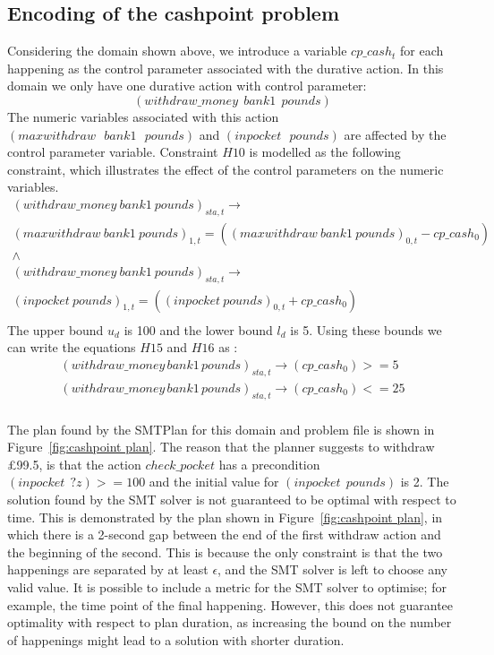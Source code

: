 \subsection{Encoding of the cashpoint problem}

Considering the domain shown above, we introduce a variable $cp\_cash_t$ for each happening as the control parameter associated with the durative action. In this domain we only have one durative action with control parameter:
$$
(withdraw\_money \ \  bank1 \ \  pounds)
$$
The numeric variables associated with this action $(maxwithdraw \ \ \ bank1 \ \ \ pounds)$ and  $(inpocket \ \ \ pounds)$ are affected by the control parameter variable. Constraint $H10$ is modelled as the following constraint, which illustrates the effect of the control parameters on the numeric variables.
$$
\begin{array}{c}
(withdraw\_money\ bank1\ pounds)_{sta,t}  \rightarrow \\
(maxwithdraw\ bank1\ pounds)_{1,t} = ((maxwithdraw\ bank1\ pounds)_{0,t} - cp\_cash_0) \\
\wedge \\
(withdraw\_money\ bank1\ pounds)_{sta,t}  \rightarrow \\
(inpocket\ pounds)_{1,t} = ((inpocket\ pounds)_{0,t} + cp\_cash_0) \\
\end{array}
$$
The upper bound $u_d$ is 100 and the lower bound $l_d$ is 5. Using these bounds we can write the equations $H15$ and $H16$ as :
$$
\begin{array}{l}
(withdraw\_money \, bank1 \, pounds)_{sta,t}  \rightarrow (cp\_cash_0) >=  5 \\
(withdraw\_money \, bank1 \, pounds)_{sta,t}  \rightarrow (cp\_cash_0) <=  25  \\
\end{array}
$$

The plan found by the SMTPlan for this domain and problem file is shown in Figure~\ref{fig:cashpoint plan}. The reason that the planner suggests to withdraw \pounds99.5, is that the action $check\_pocket$ has a precondition $(inpocket \ \ ?z) >= 100$ and the initial value for $(inpocket \ \ pounds)$ is 2. The solution found by the SMT solver is not guaranteed to be optimal with respect to time. This is demonstrated by the plan shown in Figure~\ref{fig:cashpoint plan}, in which there is a 2-second gap between the end of the first withdraw action and the beginning of the second. This is because the only constraint is that the two happenings are separated by at least $\epsilon$, and the SMT solver is left to choose any valid value. It is possible to include a metric for the SMT solver to optimise; for example, the time point of the final happening. However, this does not guarantee optimality with respect to plan duration, as increasing the bound on the number of happenings might lead to a solution with shorter duration.


